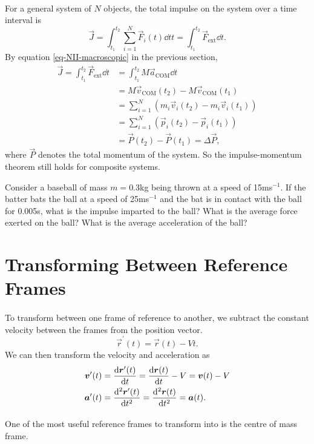 \documentclass[../classical_mechanics.tex]{subfiles}
\begin{document}
        \paragraph{}
        For a general system of $N$ objects, the total impulse on the system over a time interval is
        \begin{equation}
            \vec{J}=\int_{t_1}^{t_2}\sum_{i=1}^N\vec{F}_i(t)\dd{t}t=\int_{t_1}^{t_2}\vec{F}_\text{ext}\dd{t}.
        \end{equation}
        By equation \ref{eq-NII-macroscopic} in the previous section,
        \begin{align}
            \vec{J}=\int_{t_1}^{t_2}\vec{F}_\text{ext}\dd{t}&=\int_{t_1}^{t_2}M\vec{a}_\text{COM}\dd{t}\\
            &=M\vec{v}_\text{COM}(t_2)-M\vec{v}_\text{COM}(t_1)\\
            &=\sum_{i=1}^N\left(m_i\vec{v}_i(t_2)-m_i\vec{v}_i(t_1)\right)\\
            &=\sum_{i=1}^N\left(\vec{p}_i(t_2)-\vec{p}_i(t_1)\right)\\
            &=\vec{P}(t_2)-\vec{P}(t_1)=\Delta\vec{P},
        \end{align}
        where $\vec{P}$ denotes the total momentum of the system.
        So the impulse-momentum theorem still holds for composite systems.
        \begin{example}
            Consider a baseball of mass $m=$0.3kg being thrown at a speed of 15ms$^{-1}$.
            If the batter bats the ball at a speed of 25ms$^{-1}$ and the bat is in contact with the ball for 0.005s, what is the impulse imparted to the ball?
            What is the average force exerted on the ball? What is the average acceleration of the ball?
        \end{example}

    \section{Transforming Between Reference Frames}\label{transforming-between-reference-frames}
        \paragraph{}
        To transform between one frame of reference to another, we subtract the constant velocity between the frames from the position vector.
        \begin{equation}
            \vec{r}^\prime(t)=\vec{r}(t)-Vt.
        \end{equation}
        We can then transform the velocity and acceleration as
        \begin{align}
            \vec{v}^\prime(t)&=\dv{\vec{r}^\prime(t)}{t}=\dv{\vec{r}(t)}{t}-V=\vec{v}(t)-V\\
            \vec{a}^\prime(t)&=\dv[2]{\vec{r}^\prime(t)}{t}=\dv[2]{\vec{r}(t)}{t}=\vec{a}(t).
        \end{align}

        \paragraph{}
        One of the most useful reference frames to transform into is the centre of mass frame.
\end{document}
